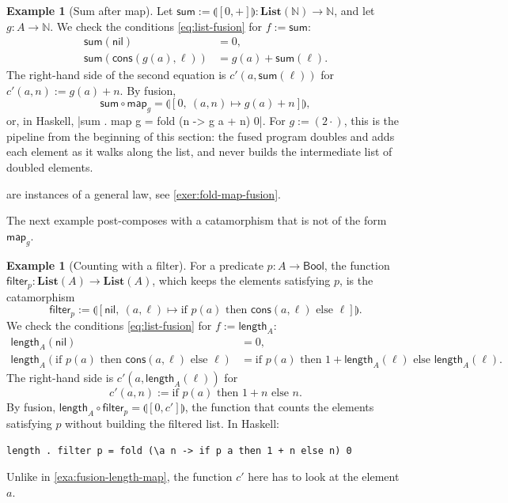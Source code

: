 \documentclass[a4paper,11pt, oneside,titlepage=false]{scrbook}
\theoremstyle{plain}
\theoremstyle{definition}
\newtheorem{exa}[thm]{Example}
\newcommand{\Catb}[1]{\mathbf{#1}}
\newcommand{\List}{\Catb{List}}
\newcommand{\catam}[1]{\llparenthesis #1 \rrparenthesis}
\newcommand{\nil}{\ensuremath{\mathsf{nil}}}
\newcommand{\cons}{\ensuremath{\mathsf{cons}}}
\newcommand{\NN}{\ensuremath{\mathbb{N}}}
\newcommand{\Bool}{\ensuremath{\mathsf{Bool}}}
\begin{document}
\begin{exa}[Sum after map]\label{exa:fusion-sum-map}
  Let $\mathsf{sum} := \catam{[0, +]} : \List(\NN) \to \NN$, and let $g : A \to \NN$.
  We check the conditions \eqref{eq:list-fusion} for $f := \mathsf{sum}$:
  \begin{align*}
    \mathsf{sum}(\nil) &= 0, \\
    \mathsf{sum}(\cons(g(a), \ell)) &= g(a) + \mathsf{sum}(\ell).
  \end{align*}
  The right-hand side of the second equation is $c'(a, \mathsf{sum}(\ell))$ for $c'(a, n) := g(a) + n$.
  By fusion,
  \[ \mathsf{sum} \circ \mathsf{map}_g = \catam{[0,\ (a, n) \mapsto g(a) + n]}, \]
  or, in Haskell, |sum . map g = fold (\a n -> g a + n) 0|.
  For $g := (2\cdot)$, this is the pipeline from the beginning of this section:
  the fused program doubles and adds each element as it walks along the list, and never builds the intermediate list of doubled elements.
\end{exa}

 are instances of a general law, see \cref{exer:fold-map-fusion}.

The next example post-composes with a catamorphism that is not of the form $\mathsf{map}_g$.

\begin{exa}[Counting with a filter]\label{exa:fusion-length-filter}
  For a predicate $p : A \to \Bool$, the function $\mathsf{filter}_p : \List(A) \to \List(A)$, which keeps the elements satisfying $p$, is the catamorphism
  \[ \mathsf{filter}_p := \catam{[\nil,\ (a, \ell) \mapsto \text{if } p(a) \text{ then } \cons(a, \ell) \text{ else } \ell]}. \]
  We check the conditions \eqref{eq:list-fusion} for $f := \mathsf{length}_A$:
  \begin{align*}
    \mathsf{length}_A(\nil) &= 0, \\
    \mathsf{length}_A(\text{if } p(a) \text{ then } \cons(a, \ell) \text{ else } \ell)
      &= \text{if } p(a) \text{ then } 1 + \mathsf{length}_A(\ell) \text{ else } \mathsf{length}_A(\ell).
  \end{align*}
  The right-hand side is $c'(a, \mathsf{length}_A(\ell))$ for
  \[ c'(a, n) := \text{if } p(a) \text{ then } 1 + n \text{ else } n. \]
  By fusion, $\mathsf{length}_A \circ \mathsf{filter}_p = \catam{[0, c']}$, the function that counts the elements satisfying $p$ without building the filtered list.
  In Haskell:
\begin{lstlisting}
length . filter p = fold (\a n -> if p a then 1 + n else n) 0
\end{lstlisting}
  Unlike in \cref{exa:fusion-length-map}, the function $c'$ here has to look at the element $a$.
\end{exa}
\end{document}
